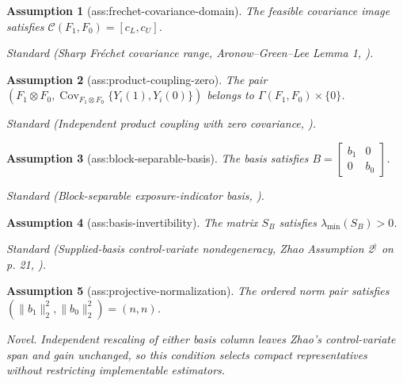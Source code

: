 \documentclass{article}
\newtheorem{assumption}{Assumption}
\begin{document}
\begin{assumption}[ass:frechet-covariance-domain]\label{ass:frechet-covariance-domain}
The feasible covariance image satisfies \(\mathcal C(F_1,F_0)=[c_L,c_U]\).
\par\smallskip\noindent\emph{Standard} (Sharp Fréchet covariance range, Aronow--Green--Lee Lemma 1, \cite{AronowGreenLee2014SharpVariance}).
\end{assumption}

\begin{assumption}[ass:product-coupling-zero]\label{ass:product-coupling-zero}
The pair \(\left(F_1\otimes F_0,\operatorname{Cov}_{F_1\otimes F_0}\{Y_i(1),Y_i(0)\}\right)\) belongs to \(\Gamma(F_1,F_0)\times\{0\}\).
\par\smallskip\noindent\emph{Standard} (Independent product coupling with zero covariance, \cite{AronowGreenLee2014SharpVariance}).
\end{assumption}

\begin{assumption}[ass:block-separable-basis]\label{ass:block-separable-basis}
The basis satisfies \(B=\begin{bmatrix}b_1&0\\0&b_0\end{bmatrix}\).
\par\smallskip\noindent\emph{Standard} (Block-separable exposure-indicator basis, \cite{Zhao2026OptimalControlVariates}).
\end{assumption}

\begin{assumption}[ass:basis-invertibility]\label{ass:basis-invertibility}
The matrix \(S_B\) satisfies \(\lambda_{\min}(S_B)>0\).
\par\smallskip\noindent\emph{Standard} (Supplied-basis control-variate nondegeneracy, Zhao Assumption 2\(^{\dagger}\) on p. 21, \cite{Zhao2026OptimalControlVariates}).
\end{assumption}

\begin{assumption}[ass:projective-normalization]\label{ass:projective-normalization}
The ordered norm pair satisfies \((\lVert b_1\rVert_2^2,\lVert b_0\rVert_2^2)=(n,n)\).
\par\smallskip\noindent\emph{Novel.} Independent rescaling of either basis column leaves Zhao's control-variate span and gain unchanged, so this condition selects compact representatives without restricting implementable estimators.
\end{assumption}
\end{document}

